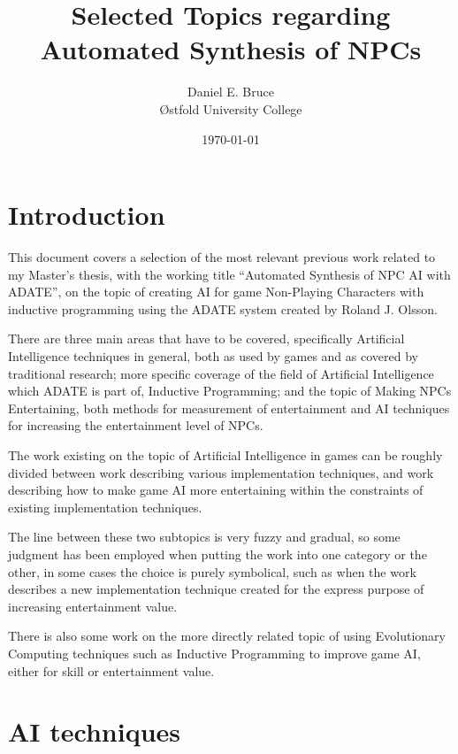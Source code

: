 \documentclass[]{report}
\begin{document}
\title{Selected Topics regarding Automated Synthesis of NPCs}
\author{Daniel E. Bruce\\ \O{}stfold University College}
\date{\today}
\maketitle

\tableofcontents


\chapter{Introduction}
\label{cha:introduction}

This document covers a selection of the most relevant previous work related to
my Master's thesis, with the working title ``Automated Synthesis of NPC AI with
ADATE'', on the topic of creating AI for game Non-Playing Characters with
inductive programming using the ADATE system created by Roland J. Olsson.

There are three main areas that have to be covered, specifically Artificial
Intelligence techniques in general, both as used by games and as covered by
traditional research; more specific coverage of the field of Artificial
Intelligence which ADATE is part of, Inductive Programming; and the topic of
Making NPCs Entertaining, both methods for measurement of entertainment and AI
techniques for increasing the entertainment level of NPCs.

The work existing on the topic of Artificial Intelligence in games can be
roughly divided between work describing various implementation techniques, and
work describing how to make game AI more entertaining within the constraints of
existing implementation techniques.

The line between these two subtopics is very fuzzy and gradual, so some judgment
has been employed when putting the work into one category or the other, in some
cases the choice is purely symbolical, such as when the work describes a new
implementation technique created for the express purpose of increasing
entertainment value.

There is also some work on the more directly related topic of using Evolutionary
Computing techniques such as Inductive Programming to improve game AI, either
for skill or entertainment value.

\chapter{AI techniques}
\label{cha:ai-techniques}
\end{document}
